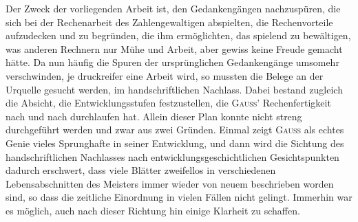 Der Zweck der vorliegenden Arbeit ist, den Gedankengängen nachzuspüren, die sich bei der Rechenarbeit des Zahlengewaltigen abspielten, die
Rechenvorteile aufzudecken und zu begründen, die ihm ermöglichten, das
spielend zu bewältigen, was anderen Rechnern nur Mühe und Arbeit, aber
gewiss keine Freude gemacht hätte. Da nun häufig die Spuren der ursprünglichen Gedankengänge umsomehr verschwinden, je druckreifer eine Arbeit
wird, so mussten die Belege an der Urquelle gesucht werden, im handschriftlichen Nachlass. Dabei bestand zugleich die Absicht, die Entwicklungsstufen
festzustellen, die \textsc{Gauss}’ Rechenfertigkeit nach und nach durchlaufen hat.
Allein dieser Plan konnte nicht streng durchgeführt werden und zwar aus
zwei Gründen. Einmal zeigt \textsc{Gauss} als echtes Genie vieles Sprunghafte in
seiner Entwicklung, und dann wird die Sichtung des handschriftlichen Nachlasses nach entwicklungsgeschichtlichen Gesichtspunkten dadurch erschwert,
dass viele Blätter zweifellos in verschiedenen Lebensabschnitten des Meisters
immer wieder von neuem beschrieben worden sind, so dass die zeitliche Einordnung in vielen Fällen nicht gelingt. Immerhin war es möglich, auch nach
dieser Richtung hin einige Klarheit zu schaffen.
\par\clearpage\endgroup
